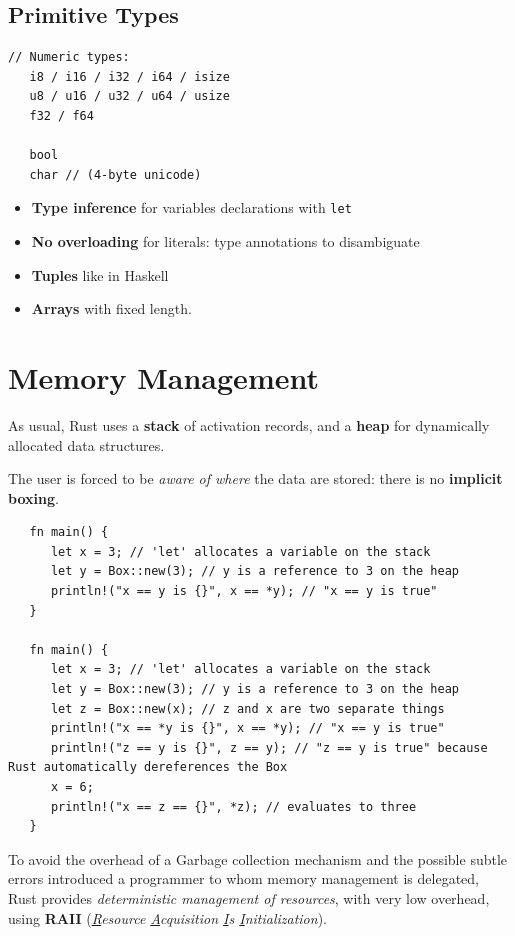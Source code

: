 \subsection{Primitive Types}
\begin{lstlisting}[caption={Rust primitive types}]
   // Numeric types:
   i8 / i16 / i32 / i64 / isize
   u8 / u16 / u32 / u64 / usize
   f32 / f64
   
   bool
   char // (4-byte unicode)
\end{lstlisting}
\begin{itemize}
\item \textbf{Type inference} for variables declarations with \lstinline|let|
\item \textbf{No overloading} for literals: type annotations to disambiguate
\item \textbf{Tuples} like in Haskell
\item \textbf{Arrays} with fixed length. 
\end{itemize}

\section{Memory Management}
As usual, Rust uses a \textbf{stack} of activation records, and a \textbf{heap} for dynamically allocated data structures.

The user is forced to be \textit{aware of where} the data are stored: 
there is no \textbf{implicit boxing}\footnotemark.


\begin{lstlisting}
   fn main() {
      let x = 3; // 'let' allocates a variable on the stack
      let y = Box::new(3); // y is a reference to 3 on the heap
      println!("x == y is {}", x == *y); // "x == y is true"
   }

   fn main() {
      let x = 3; // 'let' allocates a variable on the stack
      let y = Box::new(3); // y is a reference to 3 on the heap
      let z = Box::new(x); // z and x are two separate things
      println!("x == *y is {}", x == *y); // "x == y is true"
      println!("z == y is {}", z == y); // "z == y is true" because Rust automatically dereferences the Box
      x = 6;
      println!("x == z == {}", *z); // evaluates to three
   }
\end{lstlisting}

To avoid the overhead of a Garbage collection mechanism and the possible subtle errors introduced a programmer to whom memory management is delegated, Rust provides \textit{deterministic management of
resources}, with very low overhead, using \textbf{RAII} (\textit{\underline{R}esource \underline{A}cquisition \underline{I}s \underline{I}nitialization}).

